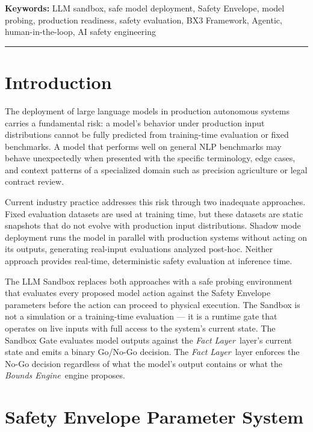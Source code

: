 \documentclass[12pt]{article}
\newcommand{\bounds}{\textit{Bounds Engine}}
\newcommand{\fact}{\textit{Fact Layer}}
\begin{document}
\vspace{0.5em}
\noindent\textbf{Keywords:} LLM sandbox, safe model deployment, Safety Envelope, model probing, production readiness, safety evaluation, BX3 Framework, Agentic, human-in-the-loop, AI safety engineering

\vspace{1em}
\hrule
\vspace{1em}

\onehalfspacing

\section{Introduction}
\label{sec:intro}

The deployment of large language models in production autonomous systems carries a fundamental risk: a model's behavior under production input distributions cannot be fully predicted from training-time evaluation or fixed benchmarks. A model that performs well on general NLP benchmarks may behave unexpectedly when presented with the specific terminology, edge cases, and context patterns of a specialized domain such as precision agriculture or legal contract review.

Current industry practice addresses this risk through two inadequate approaches. Fixed evaluation datasets are used at training time, but these datasets are static snapshots that do not evolve with production input distributions. Shadow mode deployment runs the model in parallel with production systems without acting on its outputs, generating real-input evaluations analyzed post-hoc. Neither approach provides real-time, deterministic safety evaluation at inference time.

The LLM Sandbox replaces both approaches with a safe probing environment that evaluates every proposed model action against the Safety Envelope parameters before the action can proceed to physical execution. The Sandbox is not a simulation or a training-time evaluation — it is a runtime gate that operates on live inputs with full access to the system's current state. The Sandbox Gate evaluates model outputs against the \fact\ layer's current state and emits a binary Go/No-Go decision. The \fact\ layer enforces the No-Go decision regardless of what the model's output contains or what the \bounds\ engine proposes.

\section{Safety Envelope Parameter System}
\label{sec:safety-envelope}
\end{document}
